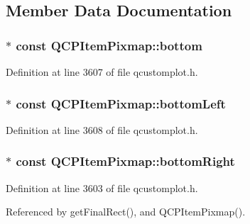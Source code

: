 \subsection{Member Data Documentation}
\hypertarget{class_q_c_p_item_pixmap_ad7da77f530868e846151eff8a28fb948}{}
\subsubsection[{bottom}]{$\ast$ const Q\+C\+P\+Item\+Pixmap\+::bottom}\label{class_q_c_p_item_pixmap_ad7da77f530868e846151eff8a28fb948}


Definition at line 3607 of file qcustomplot.\+h.

\hypertarget{class_q_c_p_item_pixmap_a01943e569233382b3627e24636b0fff2}{}
\subsubsection[{bottom\+Left}]{$\ast$ const Q\+C\+P\+Item\+Pixmap\+::bottom\+Left}\label{class_q_c_p_item_pixmap_a01943e569233382b3627e24636b0fff2}


Definition at line 3608 of file qcustomplot.\+h.

\hypertarget{class_q_c_p_item_pixmap_abcc38063f9502b876bf6615c45cc0994}{}
\subsubsection[{bottom\+Right}]{$\ast$ const Q\+C\+P\+Item\+Pixmap\+::bottom\+Right}\label{class_q_c_p_item_pixmap_abcc38063f9502b876bf6615c45cc0994}


Definition at line 3603 of file qcustomplot.\+h.



Referenced by get\+Final\+Rect(), and Q\+C\+P\+Item\+Pixmap().

\hypertarget{class_q_c_p_item_pixmap_a8c85fcb8cb8ce292859a0499d16539b1}{}
